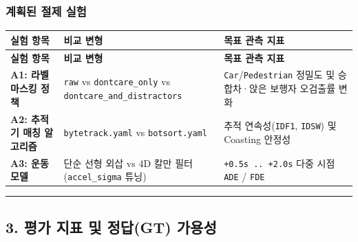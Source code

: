 \documentclass[10.5pt,a4paper]{article}
\begin{document}
\subsubsection{계획된 절제 실험}

\begin{footnotesize}
\setlength{\tabcolsep}{4pt}
\setlength{\LTleft}{0pt}\setlength{\LTright}{0pt}
\begin{longtable}{>{\raggedright\arraybackslash}p{} >{\raggedright\arraybackslash}p{} >{\raggedright\arraybackslash}p{}}
\toprule
\textbf{실험 항목} & \textbf{비교 변형} & \textbf{목표 관측 지표} \\
\midrule
\endfirsthead
\toprule
\textbf{실험 항목} & \textbf{비교 변형} & \textbf{목표 관측 지표} \\
\midrule
\endhead
\bottomrule
\endfoot
\textbf{A1: 라벨 마스킹 정책} & \texttt{raw} vs \texttt{dontcare\_\allowbreak{}only} vs \texttt{dontcare\_\allowbreak{}and\_\allowbreak{}distractors} & \texttt{Car}/\texttt{Pedestrian} 정밀도 및 승합차·앉은 보행자 오검출률 변화 \\
\textbf{A2: 추적기 매칭 알고리즘} & \texttt{bytetrack.\allowbreak{}yaml} vs \texttt{botsort.\allowbreak{}yaml} & 추적 연속성(\texttt{IDF1}, \texttt{IDSW}) 및 Coasting 안정성 \\
\textbf{A3: 운동 모델} & 단순 선형 외삽 vs 4D 칼만 필터 (\texttt{accel\_\allowbreak{}sigma} 튜닝) & \texttt{+0.\allowbreak{}5s .\allowbreak{}.\allowbreak{} +2.\allowbreak{}0s} 다중 시점 \texttt{ADE} / \texttt{FDE} \\
\end{longtable}
\end{footnotesize}


\par\noindent\rule{\textwidth}{0.4pt}\par\medskip

\subsection{3. 평가 지표 및 정답(GT) 가용성}
\end{document}
